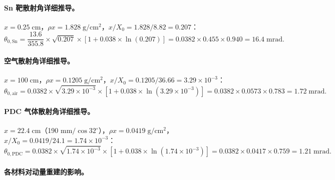 \documentclass[a4paper, 11pt]{article}
\begin{document}
\paragraph{Sn 靶散射角详细推导。}
$x = 0.25\;\mathrm{cm}$，$\rho x = 1.828\;\mathrm{g/cm^2}$，$x/X_0 = 1.828/8.82 = 0.207$：
\begin{equation}
  \theta_{0,\mathrm{Sn}} = \frac{13.6}{355.8} \times \sqrt{0.207} \times [1 + 0.038 \times \ln(0.207)]
  = 0.0382 \times 0.455 \times 0.940 = 16.4\;\mathrm{mrad}.
\end{equation}

\paragraph{空气散射角详细推导。}
$x = 100\;\mathrm{cm}$，$\rho x = 0.1205\;\mathrm{g/cm^2}$，$x/X_0 = 0.1205/36.66 = 3.29 \times 10^{-3}$：
\begin{equation}
  \theta_{0,\mathrm{air}} = 0.0382 \times \sqrt{3.29 \times 10^{-3}} \times [1 + 0.038 \times \ln(3.29 \times 10^{-3})]
  = 0.0382 \times 0.0573 \times 0.783 = 1.72\;\mathrm{mrad}.
\end{equation}

\paragraph{PDC 气体散射角详细推导。}
$x = 22.4\;\mathrm{cm}$（190 mm$/\cos 32^\circ$），$\rho x = 0.0419\;\mathrm{g/cm^2}$，$x/X_0 = 0.0419/24.1 = 1.74 \times 10^{-3}$：
\begin{equation}
  \theta_{0,\mathrm{PDC}} = 0.0382 \times \sqrt{1.74 \times 10^{-3}} \times [1 + 0.038 \times \ln(1.74 \times 10^{-3})]
  = 0.0382 \times 0.0417 \times 0.759 = 1.21\;\mathrm{mrad}.
\end{equation}

\paragraph{各材料对动量重建的影响。}
\end{document}
